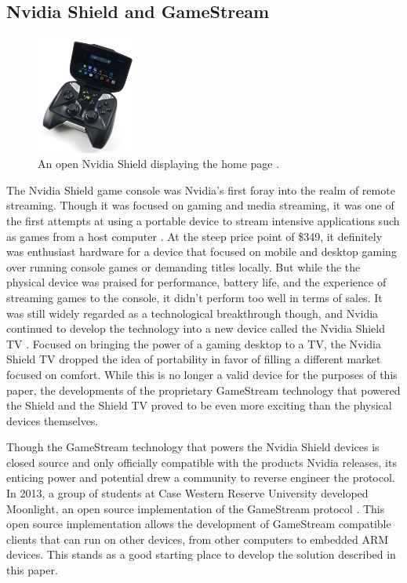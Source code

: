 \subsection{Nvidia Shield and GameStream}\label{subsec:NvidiaShieldAndGameStream}

\begin{figure}
  \centering
  \includegraphics[width=0.3\textwidth]{Figures/nvidia-shield-open-ifixit}
  \caption[Nvidia Shield]{An open Nvidia Shield displaying the home page \cite{ImageNvidiaShield}.}
  \label{fig:nvidiashield}
\end{figure}

The Nvidia Shield game console was Nvidia's first foray into the realm of remote streaming.
Though it was focused on gaming and media streaming, it was one of the first attempts at using a portable device to stream intensive applications such as games from a host computer \cite{brown_2013}.
At the steep price point of \$349, it definitely was enthusiast hardware for a device that focused on mobile and desktop gaming over running console games or demanding titles locally.
But while the the physical device was praised for performance, battery life, and the experience of streaming games to the console, it didn't perform too well in terms of sales.
It was still widely regarded as a technological breakthrough though, and Nvidia continued to develop the technology into a new device called the Nvidia Shield TV \cite{daniel_2017}.
Focused on bringing the power of a gaming desktop to a TV, the Nvidia Shield TV dropped the idea of portability in favor of filling a different market focused on comfort.
While this is no longer a valid device for the purposes of this paper, the developments of the proprietary GameStream technology that powered the Shield and the Shield TV proved to be even more exciting than the physical devices themselves.

Though the GameStream technology that powers the Nvidia Shield devices is closed source and only officially compatible with the products Nvidia releases, its enticing power and potential drew a community to reverse engineer the protocol.
In 2013, a group of students at Case Western Reserve University developed Moonlight, an open source implementation of the GameStream protocol \cite{moonlight}.
This open source implementation allows the development of GameStream compatible clients that can run on other devices, from other computers to embedded ARM devices.
This stands as a good starting place to develop the solution described in this paper.

